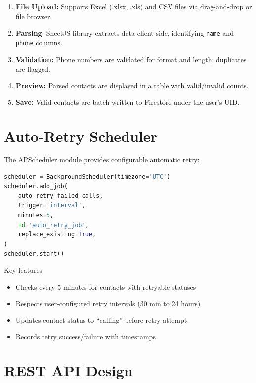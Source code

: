 \documentclass[12pt,a4paper,oneside]{book}
\begin{document}
\begin{enumerate}
    \item \textbf{File Upload:} Supports Excel (.xlsx, .xls) and CSV files via drag-and-drop or file browser.
    \item \textbf{Parsing:} SheetJS library extracts data client-side, identifying \texttt{name} and \texttt{phone} columns.
    \item \textbf{Validation:} Phone numbers are validated for format and length; duplicates are flagged.
    \item \textbf{Preview:} Parsed contacts are displayed in a table with valid/invalid counts.
    \item \textbf{Save:} Valid contacts are batch-written to Firestore under the user's UID.
\end{enumerate}

\section{Auto-Retry Scheduler}

The APScheduler module provides configurable automatic retry:

\begin{lstlisting}[language=Python, caption={Auto-Retry Scheduler Configuration}, label={lst:scheduler}]
scheduler = BackgroundScheduler(timezone='UTC')
scheduler.add_job(
    auto_retry_failed_calls,
    trigger='interval',
    minutes=5,
    id='auto_retry_job',
    replace_existing=True,
)
scheduler.start()
\end{lstlisting}

Key features:
\begin{itemize}
    \item Checks every 5 minutes for contacts with retryable statuses
    \item Respects user-configured retry intervals (30 min to 24 hours)
    \item Updates contact status to ``calling'' before retry attempt
    \item Records retry success/failure with timestamps
\end{itemize}

\section{REST API Design}
\end{document}
